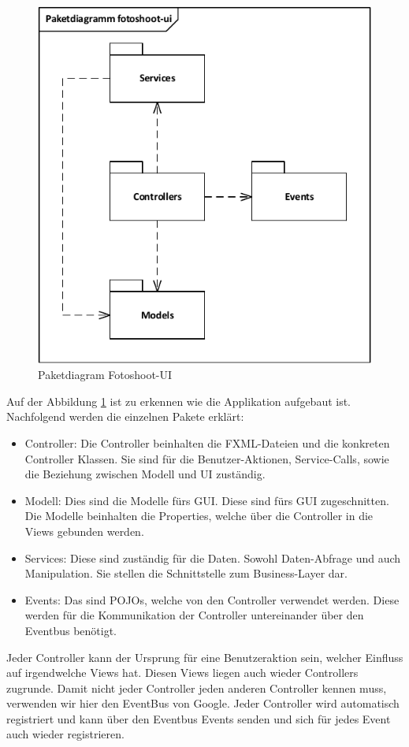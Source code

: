 \begin{figure}[h!]
	\centering
	\includegraphics[width=0.7\linewidth]{../../fig/fotoshoot-ui/fotoshoot-ui-paketdiagramm}
	\caption{Paketdiagram Fotoshoot-UI}
	\label{fig:fotoshoot-ui-paketdiagramm}
\end{figure}
		
Auf der Abbildung \ref{fig:fotoshoot-ui-paketdiagramm} ist zu erkennen wie die Applikation aufgebaut ist. Nachfolgend werden die einzelnen Pakete erklärt:
		
\begin{itemize}
	\item Controller: Die Controller beinhalten die FXML-Dateien und die konkreten Controller Klassen. Sie sind für die Benutzer-Aktionen, Service-Calls, sowie die Beziehung zwischen Modell und UI zuständig.
	\item Modell: Dies sind die Modelle fürs GUI. Diese sind fürs GUI zugeschnitten. Die Modelle beinhalten die Properties, welche über die Controller in die Views gebunden werden.
	\item Services: Diese sind zuständig für die Daten. Sowohl Daten-Abfrage und auch Manipulation. Sie stellen die Schnittstelle zum Business-Layer dar.
	\item Events: Das sind POJOs, welche von den Controller verwendet werden. Diese werden für die Kommunikation der Controller untereinander über den Eventbus benötigt.
\end{itemize}
			
Jeder Controller kann der Ursprung für eine Benutzeraktion sein, welcher Einfluss auf irgendwelche Views hat. Diesen Views liegen auch wieder Controllers zugrunde. Damit nicht jeder Controller jeden anderen Controller kennen muss, verwenden wir hier den EventBus von Google. Jeder Controller wird automatisch registriert und kann über den Eventbus Events senden und sich für jedes Event auch wieder registrieren.
